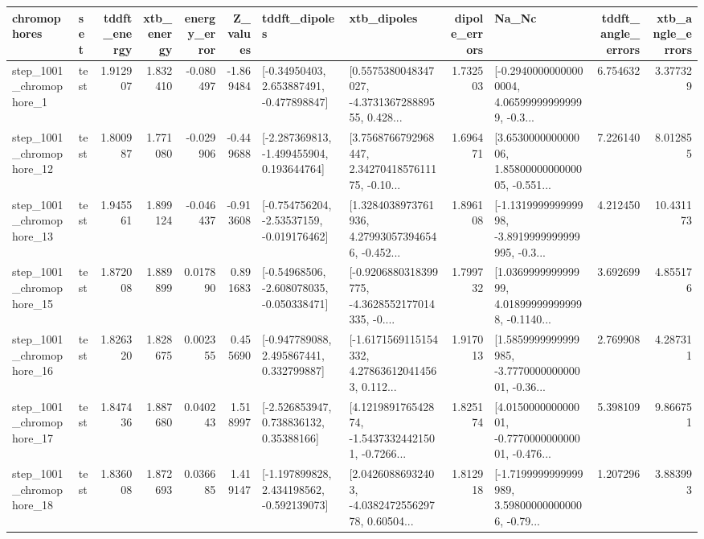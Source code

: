 \begin{tabular}{llrrrrllrlrr}
\toprule
             chromophores &       set &  tddft\_energy &  xtb\_energy &  energy\_error &  Z\_values &                               tddft\_dipoles &                                        xtb\_dipoles &  dipole\_errors &                                              Na\_Nc &  tddft\_angle\_errors &  xtb\_angle\_errors \\
\midrule
  step\_1001\_chromophore\_1 &      test &      1.912907 &    1.832410 &     -0.080497 & -1.869484 &    [-0.34950403, 2.653887491, -0.477898847] &  [0.5575380048347027, -4.373136728889555, 0.428... &       1.732503 &  [-0.29400000000000004, 4.065999999999999, -0.3... &            6.754632 &          3.377329 \\
 step\_1001\_chromophore\_12 &      test &      1.800987 &    1.771080 &     -0.029906 & -0.449688 &   [-2.287369813, -1.499455904, 0.193644764] &  [3.7568766792968447, 2.3427041857611175, -0.10... &       1.696471 &  [3.653000000000006, 1.8580000000000005, -0.551... &            7.226140 &          8.012855 \\
 step\_1001\_chromophore\_13 &      test &      1.945561 &    1.899124 &     -0.046437 & -0.913608 &   [-0.754756204, -2.53537159, -0.019176462] &  [1.3284038973761936, 4.279930573946546, -0.452... &       1.896108 &  [-1.131999999999998, -3.8919999999999995, -0.3... &            4.212450 &         10.431173 \\
 step\_1001\_chromophore\_15 &      test &      1.872008 &    1.889899 &      0.017890 &  0.891683 &   [-0.54968506, -2.608078035, -0.050338471] &  [-0.9206880318399775, -4.3628552177014335, -0.... &       1.799732 &  [1.036999999999999, 4.018999999999998, -0.1140... &            3.692699 &          4.855176 \\
 step\_1001\_chromophore\_16 &      test &      1.826320 &    1.828675 &      0.002355 &  0.455690 &    [-0.947789088, 2.495867441, 0.332799887] &  [-1.6171569115154332, 4.278636120414563, 0.112... &       1.917013 &  [1.5859999999999985, -3.777000000000001, -0.36... &            2.769908 &          4.287311 \\
 step\_1001\_chromophore\_17 &      test &      1.847436 &    1.887680 &      0.040243 &  1.518997 &     [-2.526853947, 0.738836132, 0.35388166] &  [4.121989176542874, -1.54373324421501, -0.7266... &       1.825174 &  [4.015000000000001, -0.777000000000001, -0.476... &            5.398109 &          9.866751 \\
 step\_1001\_chromophore\_18 &      test &      1.836008 &    1.872693 &      0.036685 &  1.419147 &   [-1.197899828, 2.434198562, -0.592139073] &  [2.04260886932403, -4.038247255629778, 0.60504... &       1.812918 &  [-1.7199999999999989, 3.598000000000006, -0.79... &            1.207296 &          3.883993 \\

\end{tabular}
